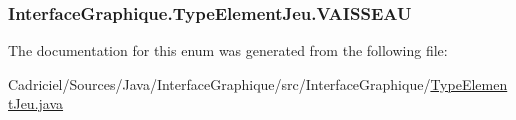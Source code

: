 \hypertarget{enum_interface_graphique_1_1_type_element_jeu_aed5814929c9a9c1190099091bd0c88ec}{
\subsubsection[{V\-A\-I\-S\-S\-E\-A\-U}]{\setlength{\rightskip}{0pt plus 5cm}Interface\-Graphique.\-Type\-Element\-Jeu.\-V\-A\-I\-S\-S\-E\-A\-U}}\label{enum_interface_graphique_1_1_type_element_jeu_aed5814929c9a9c1190099091bd0c88ec}


The documentation for this enum was generated from the following file\-:\begin{DoxyCompactItemize}
\item 
Cadriciel/\-Sources/\-Java/\-Interface\-Graphique/src/\-Interface\-Graphique/\hyperlink{_type_element_jeu_8java}{Type\-Element\-Jeu.\-java}\end{DoxyCompactItemize}

